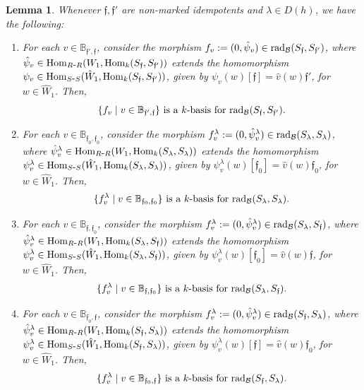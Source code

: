 \documentclass{article}
\newtheorem{lemma}[theorem]{Lemma}
\theoremstyle{definition}
\newcommand{\Hom}{{ \rm Hom }}
\newcommand{\rad}{{ \rm rad }}
\renewcommand{\frak}{\mathfrak}
\newcommand{\g}{\hbox{-}}
\newcommand{\hueca}[1]{\mathbb{#1}}
\begin{document}
\begin{lemma}\label{L: bases para rad entre simples} Whenever $\frak{f},\frak{f}'$ are non-marked idempotents  and  $\lambda\in D(h)$, we have the following:  
\begin{enumerate}
\item  For each $v\in \hueca{B}_{\frak{f}',\frak{f}}$, consider the morphism  $f_v:=(0,\hat{\psi}_v)\in \rad_{\cal B}(S_{\frak{f}},S_{\frak{f}'})$, where   $\hat{\psi}_v\in \Hom_{R\g R}(W_1,\Hom_k(S_{\frak{f}},S_{\frak{f}'}))$ extends the homomorphism $\psi_v\in \Hom_{S\g S}(\hat{W}_1,\Hom_k(S_{\frak{f}},S_{\frak{f}'}))$, given by  $\psi_v(w)[\frak{f}]=\hat{v}(w)\frak{f}'$, for $w\in \hat{W}_1$. Then,  
$$\{f_v\mid v\in \hueca{B}_{\frak{f}',\frak{f}}\}\hbox{ is a $k$-basis for }
\rad_{\cal B}(S_{\frak{f}},S_{\frak{f}'}).$$   
 \item  For each $v\in \hueca{B}_{\frak{f}_0,\frak{f}_0}$, consider the morphism  $f^\lambda_v:=(0,\hat{\psi}^\lambda_v)\in \rad_{\cal B}(S_\lambda,S_{\lambda})$, where   $\hat{\psi}^\lambda_v\in \Hom_{R\g R}(W_1,\Hom_k(S_\lambda,S_{\lambda}))$ extends the homomorphism  $\psi^\lambda_v\in \Hom_{S\g S}(\hat{W}_1,\Hom_k(S_\lambda,S_{\lambda}))$, given by  $\psi^\lambda_v(w)[\frak{f}_0]=\hat{v}(w)\frak{f}_0$, for $w\in \hat{W}_1$. Then,  
$$\{f^\lambda_v\mid v\in \hueca{B}_{\frak{f}_0,\frak{f}_0}\}\hbox{ is a $k$-basis for }\rad_{\cal B}(S_\lambda,S_{\lambda}).$$ 
\item For each $v\in \hueca{B}_{\frak{f},\frak{f}_0}$, consider the morphism  $f^\lambda_v:=(0,\hat{\psi}^\lambda_v)\in \rad_{\cal B}(S_\lambda,S_{\frak{f}})$, where   $\hat{\psi}^\lambda_v\in \Hom_{R\g R}(W_1,\Hom_k(S_\lambda,S_{\frak{f}}))$ extends the homomorphism  $\psi^\lambda_v\in \Hom_{S\g S}(\hat{W}_1,\Hom_k(S_\lambda,S_{\frak{f}}))$, given by  $\psi^\lambda_v(w)[\frak{f}_0]=\hat{v}(w)\frak{f}$, for $w\in \hat{W}_1$. Then,  
$$\{f^\lambda_v\mid v\in \hueca{B}_{\frak{f},\frak{f}_0}\}\hbox{ is a $k$-basis for }\rad_{\cal B}(S_\lambda,S_{\frak{f}}).$$ 
 \item For each $v\in \hueca{B}_{\frak{f}_0,\frak{f}}$, consider the morphism  $f^\lambda_v:=(0,\hat{\psi}^\lambda_v)\in \rad_{\cal B}(S_{\frak{f}},S_\lambda)$, where
 $\hat{\psi}^\lambda_v\in \Hom_{R\g R}(W_1,\Hom_k(S_{\frak{f}},S_\lambda))$ extends the homomorphism  $\psi^\lambda_v\in \Hom_{S\g S}(\hat{W}_1,\Hom_k(S_{\frak{f}},S_\lambda))$, given by  $\psi^\lambda_v(w)[\frak{f}]=\hat{v}(w)\frak{f}_0$, for $w\in \hat{W}_1$. Then,  
$$\{f^\lambda_v\mid v\in \hueca{B}_{\frak{f}_0,\frak{f}}\}\hbox{ is a $k$-basis for }
\rad_{\cal B}(S_{\frak{f}},S_\lambda).$$  
\end{enumerate}
\end{lemma}
\end{document}
